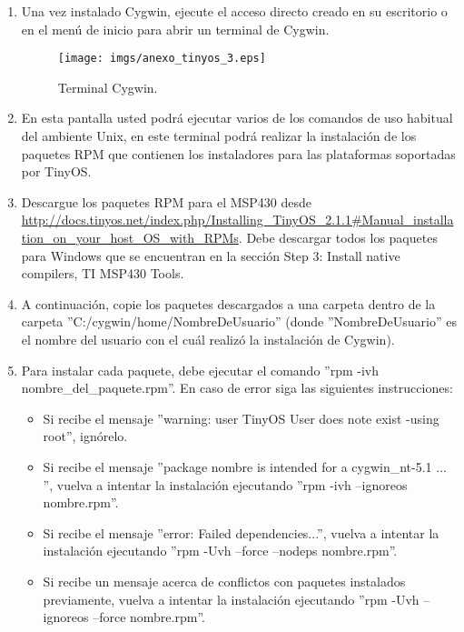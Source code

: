 \begin{enumerate}
\item Una vez instalado Cygwin, ejecute el acceso directo creado en su escritorio o en el menú de inicio para abrir un terminal de Cygwin.

\begin{center}
\begin{figure}[H]
\centering
\texttt{[image: imgs/anexo\_tinyos\_3.eps]} 
\caption{Terminal Cygwin.}
\end{figure}
\end{center}

\item En esta pantalla usted podrá ejecutar varios de los comandos de uso habitual del ambiente Unix, en este terminal podrá realizar la instalación de los paquetes RPM que contienen los instaladores para las plataformas soportadas por TinyOS.

\item Descargue los paquetes RPM para el MSP430 desde \url{http://docs.tinyos.net/index.php/Installing_TinyOS_2.1.1#Manual_installation_on_your_host_OS_with_RPMs}. Debe descargar todos los paquetes para Windows que se encuentran en la sección Step 3: Install native compilers, TI MSP430 Tools.

\item A continuación, copie los paquetes descargados a una carpeta dentro de la carpeta ''C:/cygwin/home/NombreDeUsuario'' (donde ''NombreDeUsuario'' es el nombre del usuario con el cuál realizó la instalación de Cygwin).

\item Para instalar cada paquete, debe ejecutar el comando ''rpm -ivh nombre\_del\_paquete.rpm''. En caso de error siga las siguientes instrucciones:

\begin{itemize}
\item Si recibe el mensaje ''warning: user TinyOS User does note exist -using root'', ignórelo. 
\item Si recibe el mensaje ''package nombre is intended for a cygwin\_nt-5.1 ... '', vuelva a intentar la instalación ejecutando ''rpm -ivh --ignoreos nombre.rpm''.
\item Si recibe el mensaje ''error: Failed dependencies...'', vuelva a intentar la instalación ejecutando ''rpm -Uvh --force --nodeps nombre.rpm''.
\item Si recibe un mensaje acerca de conflictos con paquetes instalados previamente, vuelva a intentar la instalación ejecutando ''rpm -Uvh --ignoreos --force nombre.rpm''.
\end{itemize}
\end{enumerate}

